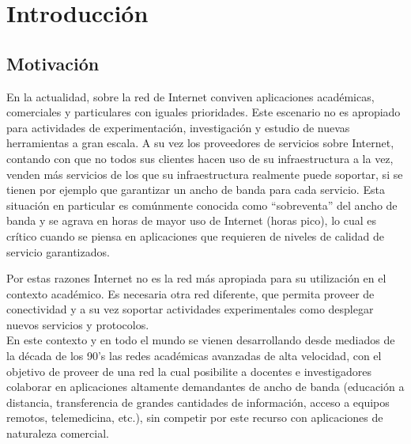 
\chapter{Introducci\'on}

\ifpdf
    \graphicspath{{Chapter1/Figs/Raster/}{Chapter1/Figs/PDF/}{Chapter2/Figs/}}
\else
    \graphicspath{{Chapter1/Figs/Vector/}{Chapter1/Figs/}}
\fi


\section{Motivación}

En la actualidad, sobre la red de Internet conviven aplicaciones académicas, comerciales y particulares con iguales prioridades. Este escenario no es apropiado para actividades de experimentación, investigación y estudio de nuevas herramientas a gran escala. A su vez los proveedores de servicios sobre Internet, contando con que no todos sus clientes hacen uso de su infraestructura a la vez, venden m\'as servicios de los que su infraestructura realmente puede soportar, si se tienen por ejemplo que garantizar un ancho de banda para cada servicio. Esta situación en particular es comúnmente conocida como “sobreventa” del ancho de banda y se agrava en horas de mayor uso de Internet (horas pico), lo cual es crítico cuando se piensa en aplicaciones que requieren de niveles de calidad de servicio garantizados.

Por estas razones Internet no es la red más apropiada para su utilización en el contexto académico. Es necesaria otra red diferente, que permita proveer de conectividad y a su vez soportar actividades experimentales como desplegar nuevos servicios y protocolos.\\ 

En este contexto y en todo el mundo se vienen desarrollando desde mediados de la década de los 90’s las redes académicas avanzadas de alta velocidad, con el objetivo de proveer de una red la cual posibilite a docentes e investigadores colaborar en aplicaciones altamente demandantes de ancho de banda   
 (educación a distancia, transferencia de grandes cantidades de información, acceso a equipos remotos, telemedicina, etc.), sin competir por este recurso con aplicaciones de naturaleza comercial.

